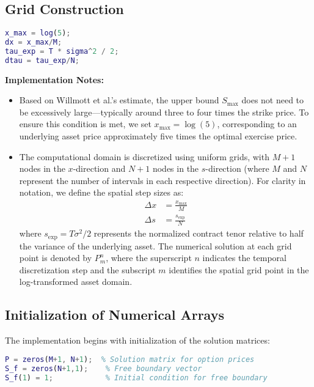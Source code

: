 \documentclass[12pt]{article}
\begin{document}
\subsection{Grid Construction}
\label{subsec:grid}
\begin{lstlisting}[language=Matlab,caption={Spatial/temporal discretization},label=code:grid]
x_max = log(5); 
dx = x_max/M;       
tau_exp = T * sigma^2 / 2;  
dtau = tau_exp/N;   
\end{lstlisting}
\textbf{Implementation Notes:}  
\begin{itemize}
    \item Based on Willmott et al.'s estimate, the upper bound \( S_{\text{max}} \) does not need to be excessively large—typically around three to four times the strike price. To ensure this condition is met, we set \( x_{\text{max}} = \log(5) \), corresponding to an underlying asset price approximately five times the optimal exercise price.
    \item The computational domain is discretized using uniform grids, with $M+1$ nodes in the $x$-direction and $N+1$ nodes in the $s$-direction (where $M$ and $N$ represent the number of intervals in each respective direction). For clarity in notation, we define the spatial step sizes as:
    \begin{align*}
        \Delta x &= \frac{x_{\text{max}}}{M} \\
        \Delta s &= \frac{s_{\text{exp}}}{N}
    \end{align*}
    where $s_{\text{exp}} = T\sigma^2/2$ represents the normalized contract tenor relative to half the variance of the underlying asset. The numerical solution at each grid point is denoted by $P^n_m$, where the superscript $n$ indicates the temporal discretization step and the subscript $m$ identifies the spatial grid point in the log-transformed asset domain.
\end{itemize}
\subsection{Initialization of Numerical Arrays}
The implementation begins with initialization of the solution matrices:

\begin{lstlisting}[language=Matlab, caption=Array initialization, label=code:init]
P = zeros(M+1, N+1);  % Solution matrix for option prices
S_f = zeros(N+1,1);    % Free boundary vector
S_f(1) = 1;            % Initial condition for free boundary
\end{lstlisting}
\end{document}
